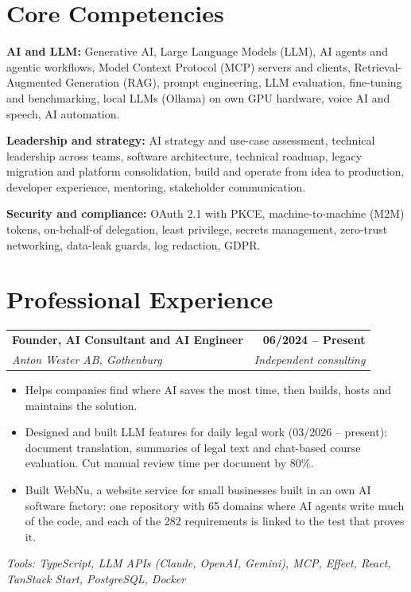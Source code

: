 \documentclass[a4paper,11pt]{article}
\makeatletter
\newcommand{\role}[4]{%
  \vspace{4pt}
  \begin{tabular*}{\textwidth}[t]{l@{\extracolsep{\fill}}r}
    \textbf{#1} & \textbf{\small #2} \\
    \textit{\small #3} & \textit{\small #4} \\
  \end{tabular*}\vspace{-2pt}}
\newenvironment{points}{\begin{itemize}[leftmargin=0.18in, itemsep=1pt, topsep=2pt, parsep=0pt]\small}{\end{itemize}}
\newcommand{\tools}[1]{{\small\textit{Tools: #1}}\par}
\makeatother
\begin{document}
\section{Core Competencies}
\small
\textbf{AI and LLM:} Generative AI, Large Language Models (LLM), AI agents and agentic workflows, Model Context Protocol (MCP) servers and clients, Retrieval-Augmented Generation (RAG), prompt engineering, LLM evaluation, fine-tuning and benchmarking, local LLMs (Ollama) on own GPU hardware, voice AI and speech, AI automation.\par\vspace{2pt}
\textbf{Leadership and strategy:} AI strategy and use-case assessment, technical leadership across teams, software architecture, technical roadmap, legacy migration and platform consolidation, build and operate from idea to production, developer experience, mentoring, stakeholder communication.\par\vspace{2pt}
\textbf{Security and compliance:} OAuth 2.1 with PKCE, machine-to-machine (M2M) tokens, on-behalf-of delegation, least privilege, secrets management, zero-trust networking, data-leak guards, log redaction, GDPR.

\section{Professional Experience}

\role{Founder, AI Consultant and AI Engineer}{06/2024 -- Present}{Anton Wester AB, Gothenburg}{Independent consulting}
\begin{points}
  \item Helps companies find where AI saves the most time, then builds, hosts and maintains the solution.
  \item Designed and built LLM features for daily legal work (03/2026 -- present): document translation, summaries of legal text and chat-based course evaluation. Cut manual review time per document by 80\%.
  \item Built WebNu, a website service for small businesses built in an own AI software factory: one repository with 65 domains where AI agents write much of the code, and each of the 282 requirements is linked to the test that proves it.
\end{points}
\tools{TypeScript, LLM APIs (Claude, OpenAI, Gemini), MCP, Effect, React, TanStack Start, PostgreSQL, Docker}
\end{document}
